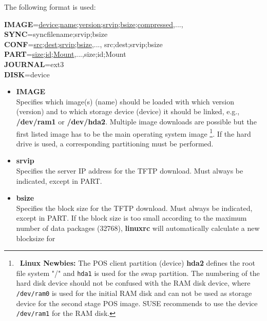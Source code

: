 The following format is used:

\begin{Command}{14cm}
            \textbf{IMAGE}=\underline{device;name;version;srvip;bsize;compressed},...,\\
            \textbf{SYNC}=syncfilename;srvip;bsize\\
            \textbf{CONF}=\underline{src;dest;srvip;bsize},...,
                          src;dest;srvip;bsize\\
            \textbf{PART}=\underline{size;id;Mount},...,size;id;Mount\\
			\textbf{JOURNAL}=ext3\\
            \textbf{DISK}=device
\end{Command}

\begin{itemize}
            \item \textbf{IMAGE}\\
                  Specifies which image(s) (name) should be loaded with which
                  version (version) and to which storage device (device) it
                  should be linked, e.g., \textbf{/dev/ram1} or
				  \textbf{/dev/hda2}. Multiple image downloads are possible but
                  the first listed image has to be the main operating system image
                  \footnote{~\textbf{Linux Newbies:}
				  The POS client partition (device)
				  \textbf{hda2} defines the root file system "/" and \texttt{hda1} is used
				   for the swap partition.
		 		  The numbering of the hard disk device should not be confused with
        		  the RAM disk device, where \texttt{/dev/ram0} is used for the initial
				  RAM disk and can not be used as storage device for the second stage
                  POS image. SUSE recommends to use the device \texttt{/dev/ram1} for the
                  RAM disk.}. If the hard drive is used, a corresponding partitioning must
                  be performed.
		    \item \textbf{srvip}\\
                  Specifies the server IP address for the TFTP download.
                  Must always be indicated, except in PART.
            \item \textbf{bsize}\\
                  Specifies the block size for the TFTP download. Must always
                  be indicated, except in PART. If the block size is too small
                  according to the maximum number of data packages (32768),
                  \textbf{linuxrc} will automatically calculate a new blocksize for

\end{itemize}
